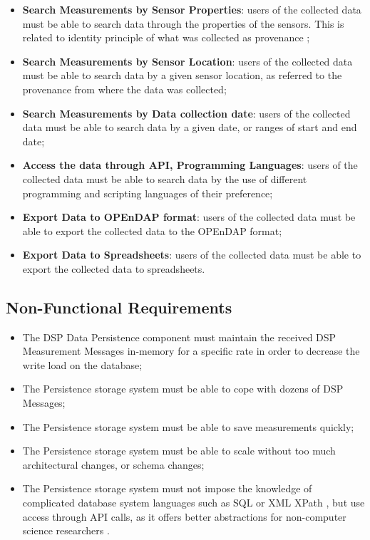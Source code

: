 \begin{itemize}
  \item \textbf{Search Measurements by Sensor Properties}: users of the
  collected data must be able to search data through the properties of the
  sensors. This is related to identity principle of what was collected
  as provenance \cite{db-provenance};
  \item \textbf{Search Measurements by Sensor Location}: users of the collected
  data must be able to search data by a given sensor location, as referred to
  the provenance from where the data was collected;
  \item \textbf{Search Measurements by Data collection date}: users of the
  collected data must be able to search data by a given date, or ranges of
  start and end date;
  \item \textbf{Access the data through API, Programming Languages}: users of the
  collected data must be able to search data by the use of different
  programming and scripting languages of their preference;
  \item \textbf{Export Data to OPEnDAP format}: users of the collected data
  must be able to export the collected data to the OPEnDAP format;
  \item \textbf{Export Data to Spreadsheets}: users of the collected data must
  be able to export the collected data to spreadsheets.
\end{itemize}

\subsection{Non-Functional Requirements}

\begin{itemize}
  \item The DSP Data Persistence component must maintain the received DSP
  Measurement Messages in-memory for a specific rate in order to decrease the
  write load on the database;
  \item The Persistence storage system must be able to cope with dozens of DSP
  Messages;
  \item The Persistence storage system must be able to save measurements quickly;
  \item The Persistence storage system must be able to scale without too much
  architectural changes, or schema changes;
  \item The Persistence storage system must not impose the knowledge of
  complicated database system languages such as SQL \cite{sql} or XML XPath
  \cite{xml-xpath}, but use access through API calls, as it offers better
  abstractions for non-computer science researchers
  \cite{sn-programming-language}.
\end{itemize}

